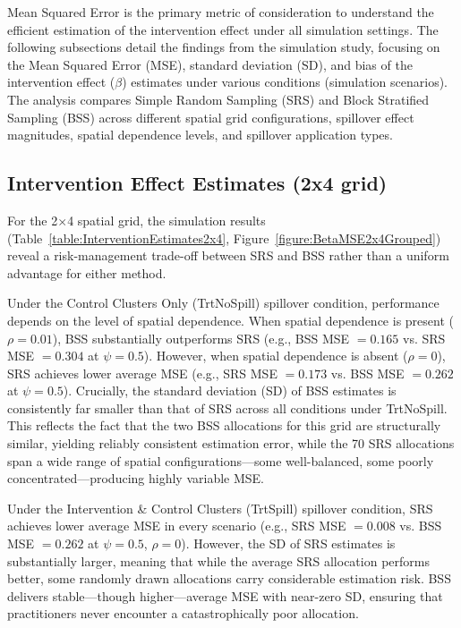 \documentclass{article}[11pt]
\begin{document}
Mean Squared Error is the primary metric of consideration to understand the efficient estimation of the intervention effect under all simulation settings. The following subsections detail the findings from the simulation study, focusing on the Mean Squared Error (MSE), standard deviation (SD), and bias of the intervention effect ($\beta$) estimates under various conditions (simulation scenarios). The analysis compares Simple Random Sampling (SRS) and Block Stratified Sampling (BSS) across different spatial grid configurations, spillover effect magnitudes, spatial dependence levels, and spillover application types.

\subsection{Intervention Effect Estimates (2x4 grid)}

For the 2$\times$4 spatial grid, the simulation results (Table~\ref{table:InterventionEstimates2x4}, Figure~\ref{figure:BetaMSE2x4Grouped}) reveal a risk-management trade-off between SRS and BSS rather than a uniform advantage for either method.

Under the Control Clusters Only (TrtNoSpill) spillover condition, performance depends on the level of spatial dependence. When spatial dependence is present ($\rho = 0.01$), BSS substantially outperforms SRS (e.g., BSS MSE $= 0.165$ vs. SRS MSE $= 0.304$ at $\psi = 0.5$). However, when spatial dependence is absent ($\rho = 0$), SRS achieves lower average MSE (e.g., SRS MSE $= 0.173$ vs. BSS MSE $= 0.262$ at $\psi = 0.5$). Crucially, the standard deviation (SD) of BSS estimates is consistently far smaller than that of SRS across all conditions under TrtNoSpill. This reflects the fact that the two BSS allocations for this grid are structurally similar, yielding reliably consistent estimation error, while the 70 SRS allocations span a wide range of spatial configurations---some well-balanced, some poorly concentrated---producing highly variable MSE.

Under the Intervention \& Control Clusters (TrtSpill) spillover condition, SRS achieves lower average MSE in every scenario (e.g., SRS MSE $= 0.008$ vs. BSS MSE $= 0.262$ at $\psi = 0.5$, $\rho = 0$). However, the SD of SRS estimates is substantially larger, meaning that while the average SRS allocation performs better, some randomly drawn allocations carry considerable estimation risk. BSS delivers stable---though higher---average MSE with near-zero SD, ensuring that practitioners never encounter a catastrophically poor allocation.
\end{document}
